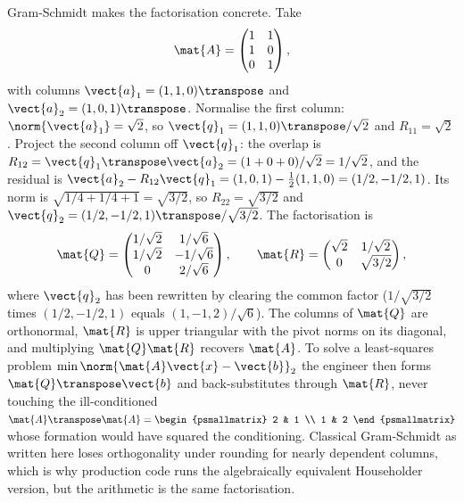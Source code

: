 \begin{example}
Gram-Schmidt makes the factorisation concrete. Take
\[
\mat{A} = \begin{pmatrix} 1 & 1 \\ 1 & 0 \\ 0 & 1 \end{pmatrix},
\]
with columns $\vect{a}_1 = (1,1,0)\transpose$ and $\vect{a}_2 =
(1,0,1)\transpose$. Normalise the first column: $\norm{\vect{a}_1} =
\sqrt{2}$, so $\vect{q}_1 = (1,1,0)\transpose/\sqrt{2}$ and $R_{11} =
\sqrt{2}$. Project the second column off $\vect{q}_1$: the overlap is
$R_{12} = \vect{q}_1\transpose\vect{a}_2 = (1 + 0 + 0)/\sqrt{2} =
1/\sqrt{2}$, and the residual is $\vect{a}_2 - R_{12}\vect{q}_1 =
(1,0,1) - \tfrac{1}{2}(1,1,0) = (1/2, -1/2, 1)$. Its norm is
$\sqrt{1/4 + 1/4 + 1} = \sqrt{3/2}$, so $R_{22} = \sqrt{3/2}$ and
$\vect{q}_2 = (1/2, -1/2, 1)\transpose/\sqrt{3/2}$. The factorisation is
\[
\mat{Q} = \begin{pmatrix} 1/\sqrt{2} & 1/\sqrt{6} \\ 1/\sqrt{2} &
-1/\sqrt{6} \\ 0 & 2/\sqrt{6} \end{pmatrix}, \qquad
\mat{R} = \begin{pmatrix} \sqrt{2} & 1/\sqrt{2} \\ 0 & \sqrt{3/2}
\end{pmatrix},
\]
where $\vect{q}_2$ has been rewritten by clearing the common factor
($1/\sqrt{3/2}$ times $(1/2,-1/2,1)$ equals $(1,-1,2)/\sqrt{6}$). The
columns of $\mat{Q}$ are orthonormal, $\mat{R}$ is upper triangular
with the pivot norms on its diagonal, and multiplying $\mat{Q}\mat{R}$
recovers $\mat{A}$. To solve a least-squares problem
$\min\norm{\mat{A}\vect{x} - \vect{b}}_2$ the engineer then forms
$\mat{Q}\transpose\vect{b}$ and back-substitutes through $\mat{R}$,
never touching the ill-conditioned $\mat{A}\transpose\mat{A} =
\begin{psmallmatrix} 2 & 1 \\ 1 & 2 \end{psmallmatrix}$ whose formation
would have squared the conditioning. Classical Gram-Schmidt as written
here loses orthogonality under rounding for nearly dependent columns,
which is why production code runs the algebraically equivalent
Householder version, but the arithmetic is the same factorisation.
\end{example}

